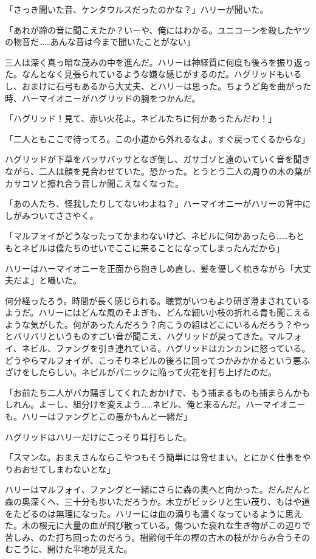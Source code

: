 \documentclass[10pt,a4paper]{article}
\begin{document}
\begin{CJK}{UTF8}{min}
「さっき聞いた音、ケンタウルスだったのかな？」ハリーが聞いた。

「あれが蹄の音に聞こえたか？いーや、俺にはわかる。ユニコーンを殺したヤツの物音だ……あんな音は今まで聞いたことがない」

三人は深く真っ暗な茂みの中を進んだ。ハリーは神経質に何度も後ろを振り返った。なんとなく見張られているような嫌な感じがするのだ。ハグリッドもいるし、おまけに石弓もあるから大丈夫、とハリーは思った。ちょうど角を曲がった時、ハーマイオニーがハグリッドの腕をつかんだ。

「ハグリッド！見て、赤い火花よ。ネビルたちに何かあったんだわ！」

「二人ともここで待ってろ。この小道から外れるなよ。すぐ戻ってくるからな」

ハグリッドが下草をバッサバッサとなぎ倒し、ガサゴソと遠のいていく音を聞きながら、二人は顔を見合わせていた。恐かった。とうとう二人の周りの木の葉がカサコソと擦れ合う音しか聞こえなくなった。

「あの人たち、怪我したりしてないわよね？」ハーマイオニーがハリーの背中にしがみついてささやく。

「マルフォイがどうなったってかまわないけど、ネビルに何かあったら……もともとネビルは僕たちのせいでここに来ることになってしまったんだから」

ハリーはハーマイオニーを正面から抱きしめ直し、髪を優しく梳きながら「大丈夫だよ」と囁いた。

何分経ったろう。時間が長く感じられる。聴覚がいつもより研ぎ澄まされているようだ。ハリーにはどんな風のそよぎも、どんな細い小枝の折れる青も聞こえるような気がした。何があったんだろう？向こうの組はどこにいるんだろう？やっとバリバリというものすごい音が聞こえ、ハグリッドが戻ってきた。マルフォイ、ネビル、ファングを引き連れている。ハグリッドはカンカンに怒っている。どうやらマルフォイが、こっそりネビルの後ろに回ってつかみかかるという悪ふざけをしたらしい。ネビルがパニックに陥って火花を打ち上げたのだ。

「お前たち二人がバカ騒ぎしてくれたおかげで、もう捕まるものも捕まらんかもしれん。よーし、組分けを変えよう……ネビル、俺と来るんだ。ハーマイオニーも。ハリーはファングとこの愚かもんと一緒だ」

ハグリッドはハリーだけにこっそり耳打ちした。

「スマンな。おまえさんならこやつもそう簡単には脅せまい。とにかく仕事をやりおおせてしまわないとな」

ハリーはマルフォイ、ファングと一緒にさらに森の奥へと向かった。だんだんと森の奥深くへ、三十分も歩いただろうか。木立がビッシリと生い茂り、もはや道をたどるのは無理になった。ハリーには血の滴りも濃くなっているように思えた。木の根元に大量の血が飛び散っている。傷ついた哀れな生き物がこの辺りで苦しみ、のた打ち回ったのだろう。樹齢何千年の樫の古木の枝がからみ合うそのむこうに、開けた平地が見えた。


\end{CJK}
\end{document}
